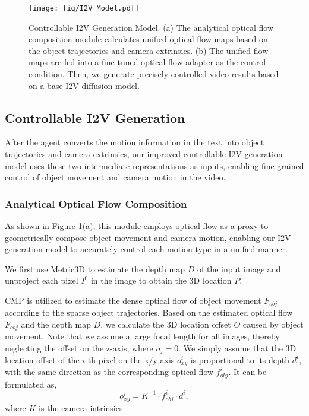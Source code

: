 \begin{figure}[t]
\centering
\texttt{[image: fig/I2V\_Model.pdf]}
\caption{Controllable I2V Generation Model. (a) The analytical optical flow composition module calculates unified optical flow maps based on the object trajectories and camera extrinsics. (b) The unified flow maps are fed into a fine-tuned optical flow adapter as the control condition. Then, we generate precisely controlled video results based on a base I2V diffusion model.}
\label{fig:i2v_model}
\end{figure}

\subsection{Controllable I2V Generation}

After the agent converts the motion information in the text into object trajectories and camera extrinsics, our improved controllable I2V generation model uses these two intermediate representations as inputs, enabling fine-grained control of object movement and camera motion in the video.

\subsubsection{Analytical Optical Flow Composition}
As shown in Figure \ref{fig:i2v_model}(a), this module employs optical flow as a proxy to geometrically compose object movement and camera motion, enabling our I2V generation model to accurately control each motion type in a unified manner.

We first use Metric3D \cite{yin2023metric3d} to estimate the depth map $D$ of the input image and unproject each pixel $I^{0}$ in the image to obtain the 3D location $P$.

CMP \cite{zhan2019self} is utilized to estimate the dense optical flow of object movement $F_{obj}$ according to the sparse object trajectories. Based on the estimated optical flow $F_{obj}$ and the depth map $D$, we calculate the 3D location offset $O$ caused by object movement. Note that we assume a large focal length for all images, thereby neglecting the offset on the z-axis, where $o_{z}=0$. We simply assume that the 3D location offset of the $i$-th pixel on the x/y-axis $o^{i}_{xy}$ is proportional to its depth $d^{i}$, with the same direction as the corresponding optical flow $f^{i}_{obj}$. It can be formulated as,
\begin{equation}
    o^{i}_{xy} = K^{-1}\cdot{f^{i}_{obj}}\cdot{d^{i}},
\end{equation}
where $K$ is the camera intrinsics.

